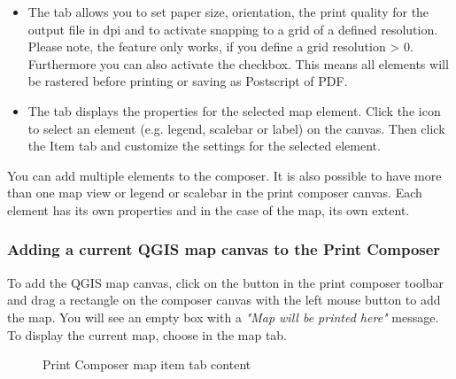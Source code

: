 \begin{itemize}
\item The  tab allows you to set paper size, orientation, the
print quality for the output file in dpi and to activate snapping to a grid
of a defined resolution. Please note, the  feature
only works, if you define a grid resolution > 0. Furthermore you can also
activate the  checkbox. This means all elements
will be rastered before printing or saving as Postscript of PDF.
\item The  tab displays the properties for the selected map element. 
Click the  
icon to select an element (e.g. legend, scalebar or label) on the canvas. 
Then click the Item tab and customize the settings for the selected 
element.
\end{itemize}

You can add multiple elements to the composer. It is also possible to have 
more than one map view or legend or scalebar in the print composer canvas. 
Each element has its own properties and in the case of the map, its own 
extent.

\subsubsection{Adding a current QGIS map canvas to the Print Composer}

To add the QGIS map canvas, click on the  button in the print composer toolbar and drag a 
rectangle on the composer canvas with the left mouse button to add the map. 
You will see an empty box with a \textit{"Map will be printed here"} message.
To display the current map, choose  in the map  tab.

\begin{figure}[ht]
\centering
\caption{Print Composer map item tab content \nixcaption}\label{fig:print_composer_map_item}
   \goodgap
\end{figure}

